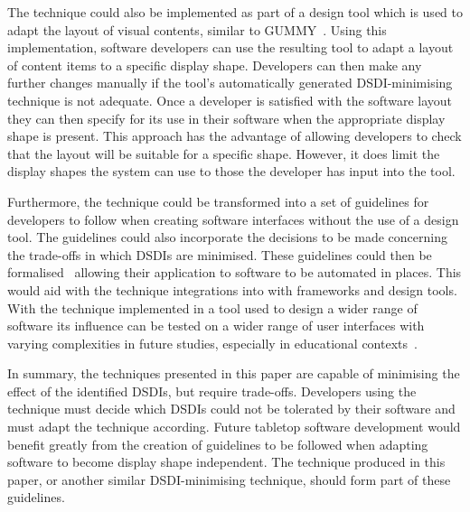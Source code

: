 \documentclass[review,5p,times,twocolumn]{elsarticle}
\begin{document}
The technique could also be implemented as part of a design tool which is used to adapt the layout of visual contents, similar to GUMMY~\cite{Meskens2008}.
Using this implementation, software developers can use the resulting tool to adapt a layout of content items to a specific display shape.
Developers can then make any further changes manually if the tool's automatically generated \ac{DSDI}-minimising technique is not adequate.
Once a developer is satisfied with the software layout they can then specify for its use in their software when the appropriate display shape is present.
This approach has the advantage of allowing developers to check that the layout will be suitable for a specific shape.
However, it does limit the display shapes the system can use to those the developer has input into the tool.

Furthermore, the technique could be transformed into a set of guidelines for developers to follow when creating software interfaces without the use of a design tool.
The guidelines could also incorporate the decisions to be made concerning the trade-offs in which \acp{DSDI} are minimised.
These guidelines could then be formalised~\cite{Ngo2000} allowing their application to software to be automated in places.
This would aid with the technique integrations into with frameworks and design tools.
With the technique implemented in a tool used to design a wider range of software its influence can be tested on a wider range of user interfaces with varying complexities in future studies, especially in educational contexts~\cite{McNaughton2017,jg-et-al:2017}.

In summary, the techniques presented in this paper are capable of minimising the effect of the identified \acp{DSDI}, but require trade-offs.
Developers using the technique must decide which \acp{DSDI} could not be tolerated by their software and must adapt the technique according.
Future tabletop software development would benefit greatly from the creation of guidelines to be followed when adapting software to become display shape independent.
The technique produced in this paper, or another similar \ac{DSDI}-minimising technique, should form part of these guidelines.






\end{document}
